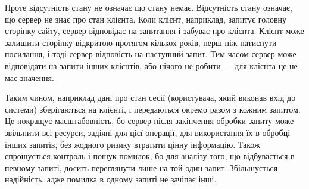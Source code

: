 Проте відсутність стану не означає що стану немає. Відсутність стану означає, що сервер не знає про стан клієнта. Коли клієнт, наприклад, запитує головну сторінку сайту, сервер відповідає на запитання і забуває про клієнта. Клієнт може залишити сторінку відкритою протягом кількох років, перш ніж натиснути посилання, і тоді сервер відповість на наступний запит. Тим часом сервер може відповідати на запити інших клієнтів, або нічого не робити — для клієнта це не має значення.

Таким чином, наприклад дані про стан сесії (користувача, який виконав вхід до системи) зберігаються на клієнті, і передаються окремо разом з кожним запитом. Це покращує масштабовність, бо сервер після закінчення обробки запиту може звільнити всі ресурси, задіяні для цієї операції, для використання їх в обробці інших запитів, без жодного ризику втратити цінну інформацію. Також спрощується контроль і пошук помилок, бо для аналізу того, що відбувається в певному запиті, досить переглянути лише на той один запит. Збільшується надійність, адже помилка в одному запиті не зачіпає інші.
